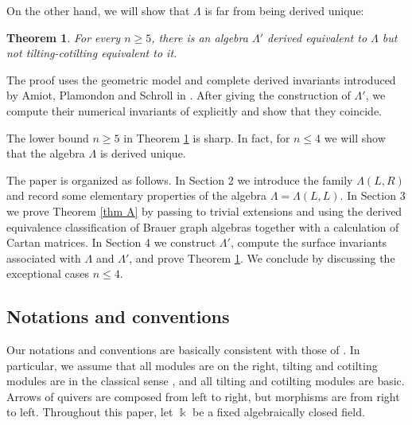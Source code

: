 \documentclass[11pt,reqno]{amsart}
\theoremstyle{plain}
\newtheorem{theorem}{Theorem}[section]
\theoremstyle{definition}
\theoremstyle{remark}
\numberwithin{equation}{section}
\begin{document}
\par On the other hand, we will show that $\Lambda$ is far from being derived unique:
\begin{theorem}\label{thm B}
    For every $n\geq5$, there is an algebra $\Lambda'$ derived equivalent to $\Lambda$ but not tilting-cotilting equivalent to it.
\end{theorem}
\par The proof uses the geometric model and complete derived invariants introduced  by Amiot, Plamondon and Schroll in \cite{APS}. After giving the construction of $\Lambda'$, we compute their numerical invariants of \cite[Theorem 7.4]{APS} explicitly and show that they coincide.
\par The lower bound $n\geq5$ in Theorem \ref{thm B} is sharp. In fact, for $n\leq4$ we will show that the algebra $\Lambda$ is derived unique.
\par The paper is organized as follows. In Section 2 we introduce the family $\Lambda(L,R)$ and record some elementary properties of the algebra $\Lambda=\Lambda(L,L)$. In Section 3 we prove Theorem \ref{thm A} by passing to trivial extensions and using the derived equivalence classification of Brauer graph algebras together with a calculation of Cartan matrices. In Section 4 we construct $\Lambda'$, compute the surface invariants associated with $\Lambda$ and $\Lambda'$, and prove Theorem \ref{thm B}. We conclude by discussing the exceptional cases $n\leq4$.

\subsection{Notations and conventions}
\par Our notations and conventions are basically consistent with those of \cite{ASS1}. In particular, we assume that all modules are on the right, tilting and cotilting modules are in the classical sense \cite[Definition VI.2.1]{ASS1}, and all tilting and cotilting modules are basic. Arrows of quivers are composed from left to right, but morphisms are from right to left. Throughout this paper, let $\Bbbk$ be a fixed algebraically closed field.
\end{document}
